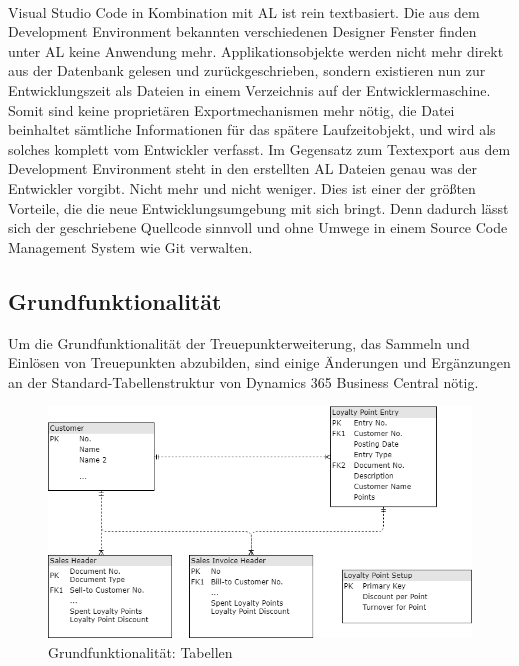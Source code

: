 \paragraph{}
Visual Studio Code in Kombination mit AL ist rein textbasiert. Die aus dem Development Environment bekannten verschiedenen Designer Fenster finden unter AL keine Anwendung mehr. Applikationsobjekte werden nicht mehr direkt aus der Datenbank gelesen und zurückgeschrieben, sondern existieren nun zur Entwicklungszeit als Dateien in einem Verzeichnis auf der Entwicklermaschine. Somit sind keine proprietären Exportmechanismen mehr nötig, die Datei beinhaltet sämtliche Informationen für das spätere Laufzeitobjekt, und wird als solches komplett vom Entwickler verfasst. Im Gegensatz zum Textexport aus dem Development Environment steht in den erstellten AL Dateien genau was der Entwickler vorgibt. Nicht mehr und nicht weniger. Dies ist einer der größten Vorteile, die die neue Entwicklungsumgebung mit sich bringt. Denn dadurch lässt sich der geschriebene Quellcode sinnvoll und ohne Umwege in einem Source Code Management System wie Git verwalten.

\pagebreak
\subsection{Grundfunktionalität}
\label{KeyFunctionality}
Um die Grundfunktionalität der Treuepunkterweiterung, das Sammeln und Einlösen von Treuepunkten abzubilden, sind einige Änderungen und Ergänzungen an der Standard-Tabellenstruktur von Dynamics 365 Business Central nötig. 

\begin{figure}[h]
	\centering
	\includegraphics[width=130mm]{images/Tables}
	\caption{Grundfunktionalität: Tabellen}
	\label{fig:Tables}
\end{figure}

